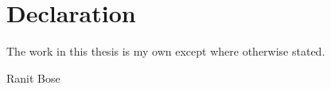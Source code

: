 
\chapter*{Declaration}\label{declaration}
\thispagestyle{empty}
The work in this thesis is my own except where otherwise stated.

\vspace{1in}


\hfill\hfill\hfill
%
Ranit Bose
%
\hspace*{\fill}
